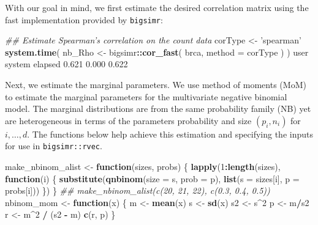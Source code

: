 \documentclass[]{article}
\newenvironment{Shaded}{\begin{snugshade}}{\end{snugshade}}
\newcommand{\CommentTok}[1]{\textcolor[rgb]{0.56,0.35,0.01}{\textit{#1}}}
\newcommand{\ControlFlowTok}[1]{\textcolor[rgb]{0.13,0.29,0.53}{\textbf{#1}}}
\newcommand{\DataTypeTok}[1]{\textcolor[rgb]{0.13,0.29,0.53}{#1}}
\newcommand{\DecValTok}[1]{\textcolor[rgb]{0.00,0.00,0.81}{#1}}
\newcommand{\FloatTok}[1]{\textcolor[rgb]{0.00,0.00,0.81}{#1}}
\newcommand{\KeywordTok}[1]{\textcolor[rgb]{0.13,0.29,0.53}{\textbf{#1}}}
\newcommand{\NormalTok}[1]{#1}
\newcommand{\OperatorTok}[1]{\textcolor[rgb]{0.81,0.36,0.00}{\textbf{#1}}}
\newcommand{\StringTok}[1]{\textcolor[rgb]{0.31,0.60,0.02}{#1}}
\begin{document}
With our goal in mind, we first estimate the desired correlation matrix using the fast implementation provided by \texttt{bigsimr}:

\begin{Shaded}
\begin{Highlighting}[]
\CommentTok{## Estimate Spearman's correlation on the count data}
\NormalTok{corType <-}\StringTok{ 'spearman'}
\KeywordTok{system.time}\NormalTok{( nb_Rho <-}\StringTok{ }\NormalTok{bigsimr}\OperatorTok{::}\KeywordTok{cor_fast}\NormalTok{( brca, }\DataTypeTok{method =}\NormalTok{ corType ) )}
\NormalTok{   user  system elapsed }
  \FloatTok{0.621}   \FloatTok{0.000}   \FloatTok{0.622} 
\end{Highlighting}
\end{Shaded}

Next, we estimate the marginal parameters.
We use method of moments (MoM) to estimate the marginal parameters for the multivariate negative binomial model.
The marginal distributions are from the same probability family (NB) yet are heterogeneous in terms of the parameters probability and size \((p_i, n_i)\) for \(i,\ldots,d\).
The functions below help achieve this estimation and specifying the inputs for use in \texttt{bigsimr::rvec}.

\begin{Shaded}
\begin{Highlighting}[]
\NormalTok{make_nbinom_alist <-}\StringTok{ }\ControlFlowTok{function}\NormalTok{(sizes, probs) \{}
  \KeywordTok{lapply}\NormalTok{(}\DecValTok{1}\OperatorTok{:}\KeywordTok{length}\NormalTok{(sizes), }\ControlFlowTok{function}\NormalTok{(i) \{}
    \KeywordTok{substitute}\NormalTok{(}\KeywordTok{qnbinom}\NormalTok{(}\DataTypeTok{size =}\NormalTok{ s, }\DataTypeTok{prob =}\NormalTok{ p), }
               \KeywordTok{list}\NormalTok{(}\DataTypeTok{s =}\NormalTok{ sizes[i], }\DataTypeTok{p =}\NormalTok{ probs[i]))}
\NormalTok{  \})}
\NormalTok{\}}
\CommentTok{## make_nbinom_alist(c(20, 21, 22), c(0.3, 0.4, 0.5))}
\NormalTok{nbinom_mom <-}\StringTok{ }\ControlFlowTok{function}\NormalTok{(x) \{}
\NormalTok{  m <-}\StringTok{ }\KeywordTok{mean}\NormalTok{(x)}
\NormalTok{  s <-}\StringTok{ }\KeywordTok{sd}\NormalTok{(x)}
\NormalTok{  s2 <-}\StringTok{ }\NormalTok{s}\OperatorTok{^}\DecValTok{2}
\NormalTok{  p <-}\StringTok{ }\NormalTok{m}\OperatorTok{/}\NormalTok{s2}
\NormalTok{  r <-}\StringTok{ }\NormalTok{m}\OperatorTok{^}\DecValTok{2} \OperatorTok{/}\StringTok{ }\NormalTok{(s2 }\OperatorTok{-}\StringTok{ }\NormalTok{m)}
  \KeywordTok{c}\NormalTok{(r, p)}
\NormalTok{\}}
\end{Highlighting}
\end{Shaded}
\end{document}
